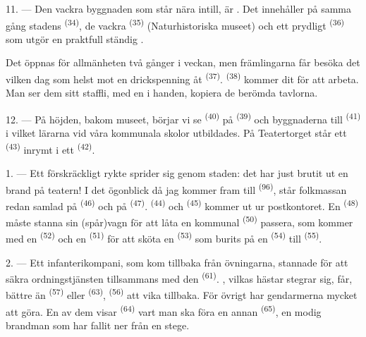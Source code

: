 \VUsaut{4.0mm}
\VUsaut{3.4mm}

11. --- Den vackra byggnaden som står nära intill, är . Det innehåller på samma
gång stadens  \textsuperscript{(34)}, de vackra
 \textsuperscript{(35)} (Naturhistoriska museet) och
ett prydligt  \textsuperscript{(36)} som utgör en praktfull ständig
.

Det öppnas för allmänheten två gånger i veckan, men främlingarna får besöka det vilken dag som
helst mot en drickspenning åt  \textsuperscript{(37)}. 
\textsuperscript{(38)} kommer dit för att arbeta. Man ser dem  sitt staffli,
med en  i handen, kopiera de berömda tavlorna.

12. --- På höjden, bakom museet, börjar vi se  \textsuperscript{(40)} på
 \textsuperscript{(39)} och byggnaderna till 
\textsuperscript{(41)} i vilket lärarna vid våra kommunala skolor utbildades. På Teatertorget
står ett  \textsuperscript{(43)} inrymt i ett 
\textsuperscript{(42)}.

\VUsaut{5.0mm}
\VUsaut{3.0mm}

\VUsaut{3.4mm}

1. --- Ett förskräckligt rykte sprider sig genom staden: det har just brutit ut en brand på
teatern! I det ögonblick då jag kommer fram till  \textsuperscript{(96)}, står
folkmassan redan samlad på  \textsuperscript{(46)} och på 
\textsuperscript{(47)}.
 \textsuperscript{(44)} och 
\textsuperscript{(45)} kommer ut ur postkontoret. En 
\textsuperscript{(48)} måste stanna sin (spår)vagn för att låta en kommunal
 \textsuperscript{(50)} passera, som kommer med en
 \textsuperscript{(52)} och en 
\textsuperscript{(51)} för att sköta en  \textsuperscript{(53)} som burits på en
 \textsuperscript{(54)} till
 \textsuperscript{(55)}.

2. --- Ett infanterikompani, som kom tillbaka från övningarna, stannade för att säkra
ordningstjänsten tillsammans med den  \textsuperscript{(61)}.
, vilkas hästar stegrar sig, får, bättre än 
\textsuperscript{(57)} eller  \textsuperscript{(63)}, 
\textsuperscript{(56)} att vika tillbaka. För övrigt har gendarmerna mycket att göra. En av
dem visar
 \textsuperscript{(64)} vart man ska föra en annan
 \textsuperscript{(65)}, en modig brandman som har fallit ner från
en stege.

